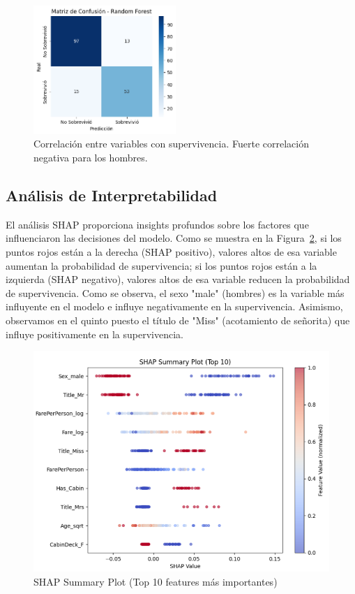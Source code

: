 \documentclass[conference]{IEEEtran}
\begin{document}
\begin{figure}[htbp]
\centering
\includegraphics[width=0.48\textwidth]{figures/matriz_rf.png}
\caption{Correlación entre variables con supervivencia. Fuerte correlación negativa para los hombres.}
\label{fig:matriz_rf}
\end{figure}

\subsection{Análisis de Interpretabilidad}

El análisis SHAP proporciona insights profundos sobre los factores que influenciaron las decisiones del modelo. Como se muestra en la Figura~\ref{fig:missingness_heatmap}, si los puntos rojos están a la derecha (SHAP positivo), valores altos de esa variable aumentan la probabilidad de supervivencia; si los puntos rojos están a la izquierda (SHAP negativo), valores altos de esa variable reducen la probabilidad de supervivencia.
Como se observa, el sexo "male" (hombres) es la variable más influyente en el modelo e influye negativamente en la supervivencia.
Asimismo, observamos en el quinto puesto el título de "Miss" (acotamiento de señorita) que influye positivamente en la supervivencia.

\begin{figure}[htbp]
\centering
\includegraphics[width=\linewidth]{figures/shap_summary.png}
\caption{SHAP Summary Plot (Top 10 features más importantes)}
\label{fig:missingness_heatmap}
\end{figure}
\end{document}
